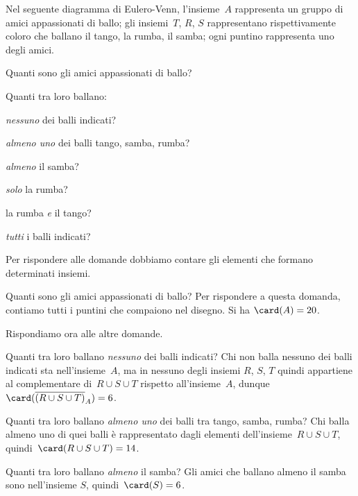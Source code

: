 \begin{exrig}
 \begin{esempio}
Nel seguente diagramma di Eulero-Venn, l'insieme~$A$ rappresenta un gruppo di amici appassionati di ballo; gli insiemi~$T$, $R$,
$S$ rappresentano rispettivamente coloro che ballano il tango, la rumba, il samba; ogni puntino rappresenta uno degli amici.
\begin{multicols}{2}
Quanti sono gli amici appassionati di ballo?

Quanti tra loro ballano:
\begin{enumeratea}
\item \emph{nessuno} dei balli indicati?
\item \emph{almeno uno} dei balli tango, samba, rumba?
\item \emph{almeno} il samba?
\item \emph{solo} la rumba?
\item la rumba \emph{e} il tango?
\item \emph{tutti} i balli indicati?
\end{enumeratea}
\begin{center}
 
\end{center}
\end{multicols}

Per rispondere alle domande dobbiamo contare gli elementi che formano determinati insiemi.

Quanti sono gli amici appassionati di ballo? Per rispondere a questa
domanda, contiamo tutti i puntini che compaiono nel disegno. Si ha 
$\card(A)=20$.

Rispondiamo ora alle altre domande.
\begin{enumeratea}
\item Quanti tra loro ballano \emph{nessuno} dei balli indicati?
Chi non balla nessuno dei balli indicati sta nell'insieme~$A$, ma in nessuno degli insiemi
$R$, $S$, $T$ quindi appartiene al complementare
di~$R\cup S\cup T$ rispetto all'insieme~$A$,
dunque~$\card(\overline{({R\cup S\cup T})}_{A})=6$.

\item Quanti tra loro ballano \emph{almeno uno} dei balli tra tango, samba, rumba? Chi balla almeno uno di quei balli è rappresentato dagli elementi
dell'insieme~$R\cup S\cup T$, quindi~$\card(R\cup S\cup T)=14$.

\item Quanti tra loro ballano \emph{almeno} il samba?
Gli amici che ballano almeno il samba sono nell'insieme
$S$, quindi~$\card(S)=6$.


\end{enumeratea}
\end{esempio}
\end{exrig}
